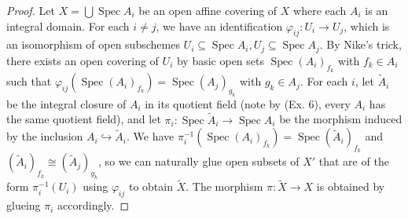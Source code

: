 \documentclass{article}
\DeclareMathOperator{\spec}{Spec}
\begin{document}
\begin{enumerate} [label=\textbf{\arabic*.}, leftmargin=0em]
\begin{proof}
    Let $X = \bigcup \spec{A_i}$ be an open affine covering of $X$ where each $A_i$ is an integral domain. For each $i \neq j$, we have an identification $\varphi_{ij} : U_i \to U_j$, which is an isomorphism of open subschemes $U_i \subseteq\spec{A_i}, U_j \subseteq \spec{A_j}$. By Nike's trick, there exists an open covering of $U_i$ by basic open sets $\spec{(A_i)_{f_k}}$ with $f_k \in A_i$ such that $\varphi_{ij}(\spec{(A_i)_{f_k}}) = \spec{(A_j)_{g_k}}$ with $g_k \in A_j$. For each $i$, let $\tilde{A}_i$ be the integral closure of $A_i$ in its quotient field (note by (Ex. 6), every $A_i$ has the same quotient field), and let $\pi_i : \spec{\tilde{A}_i} \to \spec{A_i}$ be the morphism induced by the inclusion $A_i \hookrightarrow \tilde{A}_i$. We have $\pi_i^{-1}(\spec{(A_i)_{f_k}}) = \spec{(\tilde{A}_i)_{f_k}}$ and $(\tilde{A}_i)_{f_k} \cong (\tilde{A}_j)_{g_k}$, so we can naturally glue open subsets of $X'$ that are of the form $\pi_i^{-1}(U_i)$ using $\varphi_{ij}$ to obtain $\tilde{X}$. The morphism $\pi : \tilde{X} \to X$ is obtained by glueing $\pi_i$ accordingly.


\end{proof}
\end{enumerate}
\end{document}
